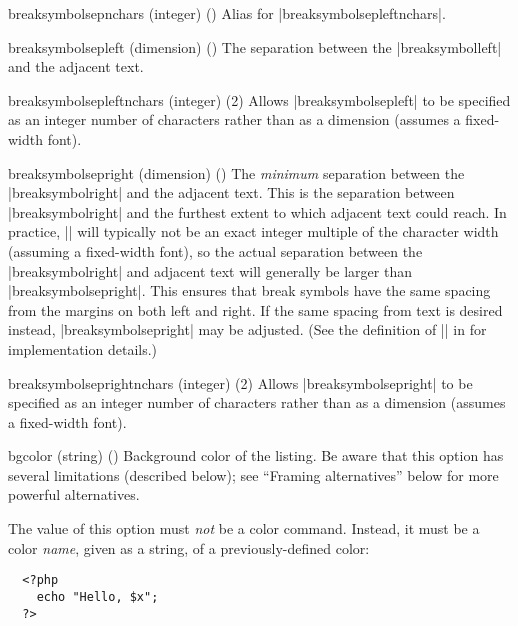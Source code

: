\begin{optionlist}
\item[breaksymbolsepnchars (integer) (\meta{breaksymbolsepleftnchars})]
Alias for |breaksymbolsepleftnchars|.


\item[breaksymbolsepleft (dimension) (\meta{breaksymbolsepleftnchars})]
The separation between the |breaksymbolleft| and the adjacent text. 

\item[breaksymbolsepleftnchars (integer) (2)]
Allows |breaksymbolsepleft| to be specified as an integer number of characters rather than as a dimension (assumes a fixed-width font).


\item[breaksymbolsepright (dimension) (\meta{breaksymbolseprightnchars})]
The \emph{minimum} separation between the |breaksymbolright| and the adjacent text.  This is the separation between |breaksymbolright| and the furthest extent to which adjacent text could reach.  In practice, |\linewidth| will typically not be an exact integer multiple of the character width (assuming a fixed-width font), so the actual separation between the |breaksymbolright| and adjacent text will generally be larger than |breaksymbolsepright|.  This ensures that break symbols have the same spacing from the margins on both left and right.  If the same spacing from text is desired instead, |breaksymbolsepright| may be adjusted.  (See the definition of |\FV@makeLineNumber| in  for implementation details.)

\item[breaksymbolseprightnchars (integer) (2)]
Allows |breaksymbolsepright| to be specified as an integer number of characters rather than as a dimension (assumes a fixed-width font).


  \item[bgcolor (string) (\meta{none})]
    Background color of the listing.  Be aware that this option has several limitations (described below); see ``Framing alternatives'' below for more powerful alternatives.

    The value of this option must \emph{not} be a color command. Instead, it must be a color \emph{name}, given as a string, of a previously-defined color:

\begin{example}
  \begin{verbatim}
  <?php
    echo "Hello, $x";
  ?>
  \end{verbatim}
\end{example}


\end{optionlist}
